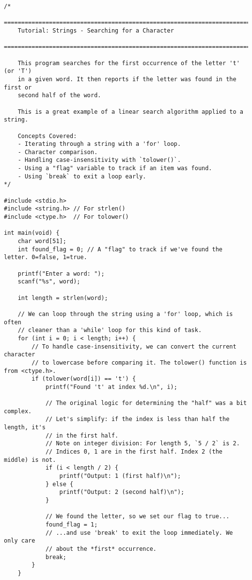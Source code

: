 \documentclass[11pt]{book}
\begin{document}
\begin{verbatim}
/*
    ================================================================================
    Tutorial: Strings - Searching for a Character
    ================================================================================

    This program searches for the first occurrence of the letter 't' (or 'T')
    in a given word. It then reports if the letter was found in the first or
    second half of the word.

    This is a great example of a linear search algorithm applied to a string.

    Concepts Covered:
    - Iterating through a string with a 'for' loop.
    - Character comparison.
    - Handling case-insensitivity with `tolower()`.
    - Using a "flag" variable to track if an item was found.
    - Using `break` to exit a loop early.
*/

#include <stdio.h>
#include <string.h> // For strlen()
#include <ctype.h>  // For tolower()

int main(void) {
    char word[51];
    int found_flag = 0; // A "flag" to track if we've found the letter. 0=false, 1=true.

    printf("Enter a word: ");
    scanf("%s", word);

    int length = strlen(word);

    // We can loop through the string using a 'for' loop, which is often
    // cleaner than a 'while' loop for this kind of task.
    for (int i = 0; i < length; i++) {
        // To handle case-insensitivity, we can convert the current character
        // to lowercase before comparing it. The tolower() function is from <ctype.h>.
        if (tolower(word[i]) == 't') {
            printf("Found 't' at index %d.\n", i);

            // The original logic for determining the "half" was a bit complex.
            // Let's simplify: if the index is less than half the length, it's
            // in the first half.
            // Note on integer division: For length 5, `5 / 2` is 2.
            // Indices 0, 1 are in the first half. Index 2 (the middle) is not.
            if (i < length / 2) {
                printf("Output: 1 (first half)\n");
            } else {
                printf("Output: 2 (second half)\n");
            }

            // We found the letter, so we set our flag to true...
            found_flag = 1;
            // ...and use 'break' to exit the loop immediately. We only care
            // about the *first* occurrence.
            break;
        }
    }


\end{verbatim}
\end{document}
